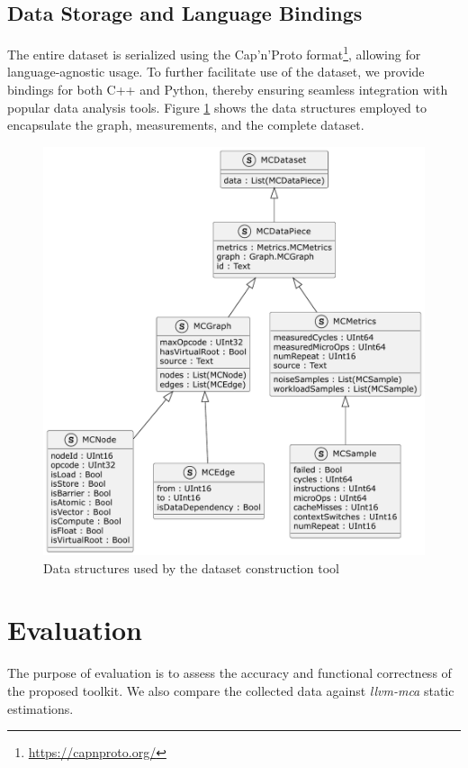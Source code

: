 \subsection{Data Storage and Language Bindings}

The entire dataset is serialized using the Cap'n'Proto format\footnote{\url{https://capnproto.org/}},
allowing for language-agnostic usage. To further facilitate use of the dataset, we provide bindings for
both C++ and Python, thereby ensuring seamless integration with popular data analysis tools. Figure
\ref{fig:datastruct} shows the data structures employed to encapsulate the graph, measurements, and the
complete dataset.

\begin{figure}[h]
  \centering
  \includegraphics[width=0.9\columnwidth]{data_structures}
  \caption{Data structures used by the dataset construction tool}
  \label{fig:datastruct}
\end{figure}

\section{Evaluation}

The purpose of evaluation is to assess the accuracy and functional correctness of the proposed toolkit.
We also compare the collected data against \textit{llvm-mca} static estimations.

